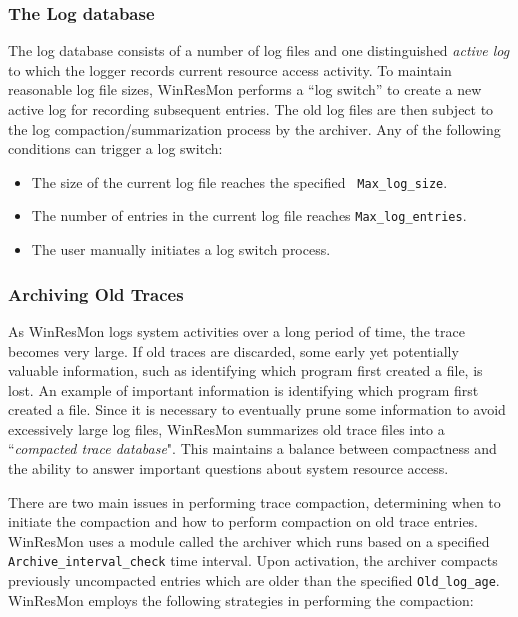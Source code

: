 \subsubsection{The Log database}

The log database consists of a number of log files and one
distinguished {\it active log} to which the logger 
records current resource access activity.
To maintain reasonable log file sizes, WinResMon performs a ``log switch'' 
to create a new active log for recording subsequent entries.  The old
log files are then subject to the log compaction/summarization process by the
archiver.  Any of the following conditions can trigger a log switch: \\

\begin{itemize}
\item The size of the current log file reaches the specified {\tt
Max\_log\_size}. \\
\item The number of entries in the current log file reaches
{\tt Max\_log\_entries}. \\
\item The user manually initiates a log switch process.
\end{itemize}


\subsubsection{Archiving Old Traces}

As WinResMon logs system activities over a long period of time, the trace
becomes very large. If old traces are discarded, some early yet potentially valuable information,
such as identifying which program first created a file, is lost. An example of important information is
identifying which program first created a file.  Since it is necessary
to eventually prune some information to avoid excessively large log files,
WinResMon summarizes old trace files into a ``{\em compacted trace database}".
This maintains a balance between compactness and the ability to answer
important questions about system resource access.

There are two main issues in performing trace compaction, determining when to
initiate the compaction and how to perform compaction on old trace entries.
WinResMon uses a module called the archiver which runs based on a specified 
{\tt Archive\_interval\_check} time interval.  Upon activation, the archiver
compacts previously uncompacted entries which are older than the specified 
{\tt Old\_log\_age}.  
WinResMon employs the following strategies in performing the compaction:

